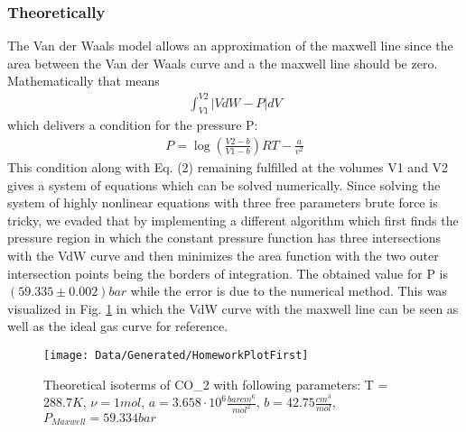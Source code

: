 \documentclass[a4paper,10pt,twocolumn]{article}
\begin{document}
    \subsubsection{Theoretically}\label{subsubsec:maxwellFromTheory}
    The Van der Waals model allows an approximation of the maxwell line since the area between the Van der Waals curve and a the maxwell line should be zero.
    Mathematically that means
    \begin{align}
        \int_{V1}^{V2} |VdW - P| dV
        \end{align}
    which delivers a condition for the pressure P:
    \begin{align}
        P=\log(\frac{V2-b}{V1-b}) RT - \frac{a}{v^2}
    \end{align}
    This condition along with Eq. (2) remaining fulfilled at the volumes V1 and V2 gives a system of equations which can be solved numerically.
    Since solving the system of highly nonlinear equations with three free parameters brute force is tricky, we evaded that by implementing a different algorithm
    which first finds the pressure region in which the constant pressure function has three intersections with the VdW curve and then minimizes the area function
    with the two outer intersection points being the borders of integration.
    The obtained value for P is $(59.335\pm 0.002) bar$ while the error is due to the numerical method.
    This was visualized in Fig. \ref{fig:homeworkPlotOne} in which the VdW curve with the maxwell line can be seen as well as the ideal gas curve for reference.
    \begin{figure}
        \begin{center}
            \texttt{[image: Data/Generated/HomeworkPlotFirst]}
            \caption[]{Theoretical isoterms of CO_2\) with following parameters:
            T = $288.7K$, $\nu=1 mol$, $a=3.658\cdot 10^6 \frac{bar cm^6}{mol^2}$, $b=42.75 \frac{cm^3}{mol}$, $P_{Maxwell}=59.334 bar$}
            \label{fig:homeworkPlotOne}
        \end{center}
    \end{figure}
    
\end{document}
